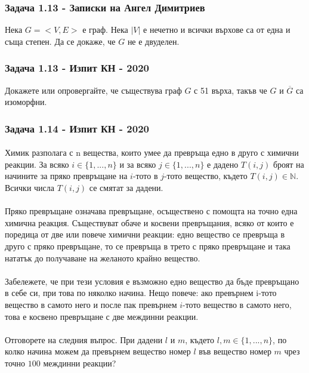 \documentclass[12pt]{article}
\begin{document}
\subsubsection*{Задача 1.13 - Записки на Ангел Димитриев}
Нека $G = <V, E>$ е граф. Нека $|V|$ е нечетно и всички върхове са от една и съща степен. Да се докаже, че $G$ не е двуделен. 
\subsubsection*{Задача 1.13 - Изпит КН - 2020}
Докажете или опровергайте, че съществува граф $G$ с 51 върха, такъв че $G$ и $\overline{G}$ са изоморфни.
\subsubsection*{Задача 1.14 - Изпит КН - 2020}
\paragraph*{}
Химик разполага с n вещества, които умее да превръща едно в друго с химични реакции. За всяко $i \in \{ 1, ..., n\}$ и за всяко $j \in \{ 1, ..., n \}$ е дадено $T(i, j)$ броят на начините за пряко превръщане на $i$-тото в $j$-тото вещество, където $T(i, j) \in \mathbb{N}$. Всички числа $T(i, j)$ се смятат за $\textbf{дадени}$. 
\paragraph*{}
Пряко превръщане означава превръщане, осъществено с помощта на точно една химична реакция. Съществуват обаче и косвени превръщания, всяко от които е поредица от две или повече химични реакции: едно вещество се превръща в друго с пряко превръщане, то се превръща в трето с пряко превръщане и така нататък до получаване на желаното крайно вещество.
\paragraph*{}
Забележете, че при тези условия е възможно едно вещество да бъде превръщано в себе си, при това по няколко начина. Нещо повече: ако превърнем i-тото вещество в самото него и после пак превърнем $i$-тото вещество в самото него, това е косвено превръщане с две междинни реакции.
\paragraph*{}
Отговорете на следния въпрос. При дадени $l$ и $m$, където $l, m \in \{ 1, ..., n \}$, по колко начина можем да превърнем вещество номер $l$ във вещество номер $m$ чрез точно $100$ междинни реакции?
\end{document}
